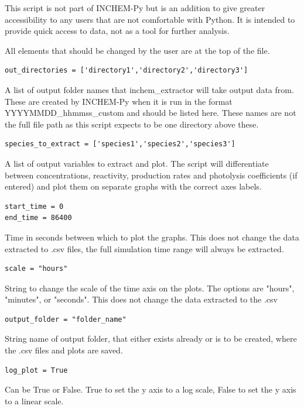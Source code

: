 \documentclass[a4paper]{refart}
\begin{document}
This script is not part of INCHEM-Py but is an addition to give greater accessibility to any users that are not comfortable with Python. It is intended to provide quick access to data, not as a tool for further analysis.

All elements that should be changed by the user are at the top of the file.

\begin{verbatim}
out_directories = ['directory1','directory2','directory3']
\end{verbatim}
A list of output folder names that inchem\_extractor will take output data from. These are created by INCHEM-Py when it is run in the format YYYYMMDD\_hhmmss\_custom and should be listed here. These names are not the full file path as this script expects to be one directory above these.

\begin{verbatim}
species_to_extract = ['species1','species2','species3']
\end{verbatim}
A list of output variables to extract and plot. The script will differentiate between concentrations, reactivity, production rates and photolysis coefficients (if entered) and plot them on separate graphs with the correct axes labels. 

\begin{verbatim}
start_time = 0
end_time = 86400
\end{verbatim}
Time in seconds between which to plot the graphs. This does not change the data extracted to .csv files, the full simulation time range will always be extracted.

\begin{verbatim}
scale = "hours"
\end{verbatim}
String to change the scale of the time axis on the plots. The options are "hours", "minutes", or "seconds". This does not change the data extracted to the .csv

\begin{verbatim}
output_folder = "folder_name"
\end{verbatim}
String name of output folder, that either exists already or is to be created, where the .csv files and plots are saved.

\begin{verbatim}
log_plot = True
\end{verbatim}
Can be True or False. True to set the y axis to a log scale, False to set the y axis to a linear scale.
\end{document}

